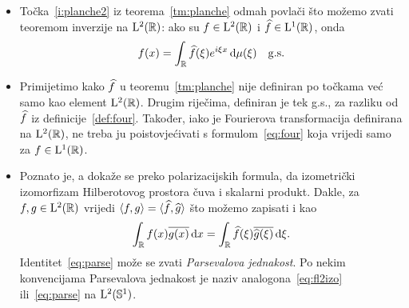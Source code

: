 \documentclass[main.tex]{subfiles}
\begin{document}
\begin{komentar}\label{kom:four-planche}
	\begin{itemize}
		\item Točka~\ref{i:planche2} iz teorema~\ref{tm:planche}
		      odmah povlači što možemo zvati teoremom inverzije na \( \mathrm{L}^2(\mathbb{R}) \): ako
		      su \( f \in \mathrm{L}^2(\mathbb{R}) \) i \( \widehat{f} \in \mathrm{L}^1(\mathbb{R}) \), onda
		      \begin{equation}
			      f(x) = \int_{\mathbb{R}} \widehat{f}(\xi) e^{i\xi x} \,\mathrm d \mu(\xi) \quad \mathrm{g.s.}
		      \end{equation}

		\item Primijetimo kako \( \widehat{f} \) u teoremu~\ref{tm:planche}
		      nije definiran po točkama već samo kao element \( \mathrm{L}^2(\mathbb{R}) \).
		      Drugim riječima, definiran je tek g.s., za razliku od \( \widehat{f} \)
		      iz definicije~\ref{def:four}.
		      Također, iako je Fourierova transformacija definirana na \( \mathrm{L}^2(\mathbb{R}) \),
		      ne treba ju poistovjećivati s formulom~\eqref{eq:four}
		      koja vrijedi samo za \( f \in \mathrm{L}^1(\mathbb{R}) \).

		\item Poznato je, a dokaže se preko polarizacijskih formula,
		      da izometrički izomorfizam Hilberotovog prostora čuva i skalarni produkt.
		      Dakle, za \( f,g \in \mathrm{L}^2(\mathbb{R}) \) vrijedi
		      \( \left\langle {f}, {g} \right\rangle = \langle \scriptsize \widehat{f}, \widehat{g} \rangle \)
		      što možemo zapisati i kao
		      \begin{equation}\label{eq:parse}
			      \int_{\mathbb{R}} f(x) \overline{g(x)} \,\mathrm d x =
			      \int_{\mathbb{R}} \widehat{f}(\xi) \overline{\widehat{g}(\xi)} \,\mathrm d \xi.
		      \end{equation}
		      Identitet~\eqref{eq:parse} može se zvati
		      \emph{Parsevalova jednakost}. Po nekim konvencijama Parsevalova jednakost
		      je naziv analogona~\eqref{eq:fl2izo} ili~\eqref{eq:parse}
		      na \( \mathrm{L}^2(\mathbb S^1) \).
	\end{itemize}
\end{komentar}
\end{document}
